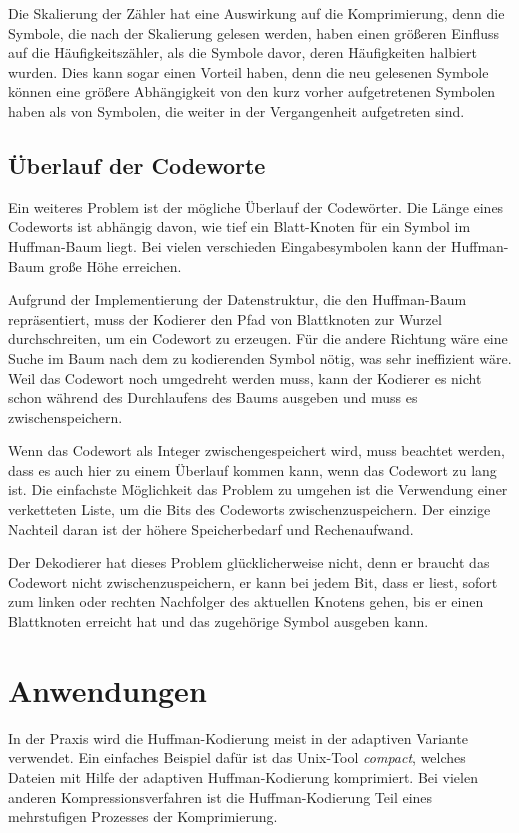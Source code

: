 \documentclass[twoside,11pt,a4paper]{article}
\theoremstyle{break}
\begin{document}
Die Skalierung der Zähler hat eine Auswirkung auf die Komprimierung,
denn die Symbole, die nach der Skalierung gelesen werden, haben einen
größeren Einfluss auf die Häufigkeitszähler, als die Symbole davor,
deren Häufigkeiten halbiert wurden. Dies kann sogar einen Vorteil
haben, denn die neu gelesenen Symbole können eine größere Abhängigkeit
von den kurz vorher aufgetretenen Symbolen haben als von Symbolen, die
weiter in der Vergangenheit aufgetreten sind.

\subsection{Überlauf der Codeworte}
Ein weiteres Problem ist der mögliche Überlauf der Codewörter. Die
Länge eines Codeworts ist abhängig davon, wie tief ein Blatt-Knoten
für ein Symbol im Huffman-Baum liegt. Bei vielen verschieden
Eingabesymbolen kann der Huffman-Baum große Höhe erreichen.

Aufgrund der Implementierung der Datenstruktur, die den Huffman-Baum
repräsentiert, muss der Kodierer den Pfad von Blattknoten zur Wurzel
durchschreiten, um ein Codewort zu erzeugen. Für die andere Richtung
wäre eine Suche im Baum nach dem zu kodierenden Symbol nötig, was sehr
ineffizient wäre. Weil das Codewort noch umgedreht werden muss, kann
der Kodierer es nicht schon während des Durchlaufens des Baums
ausgeben und muss es zwischenspeichern.

Wenn das Codewort als Integer zwischengespeichert wird, muss beachtet
werden, dass es auch hier zu einem Überlauf kommen kann, wenn das
Codewort zu lang ist. Die einfachste Möglichkeit das Problem zu
umgehen ist die Verwendung einer verketteten Liste, um die Bits des
Codeworts zwischenzuspeichern.  Der einzige Nachteil daran ist der
höhere Speicherbedarf und Rechenaufwand.

Der Dekodierer hat dieses Problem glücklicherweise nicht, denn er
braucht das Codewort nicht zwischenzuspeichern, er kann bei jedem Bit,
dass er liest, sofort zum linken oder rechten Nachfolger des aktuellen
Knotens gehen, bis er einen Blattknoten erreicht hat und das
zugehörige Symbol ausgeben kann.

\section{Anwendungen}
In der Praxis wird die Huffman-Kodierung meist in der adaptiven
Variante verwendet. Ein einfaches Beispiel dafür ist das Unix-Tool
\emph{compact}, welches Dateien mit Hilfe der adaptiven
Huffman-Kodierung komprimiert. Bei vielen anderen
Kompressionsverfahren ist die Huffman-Kodierung Teil eines
mehrstufigen Prozesses der Komprimierung. \cite[S. 234]{Salomon:2010}
\end{document}
